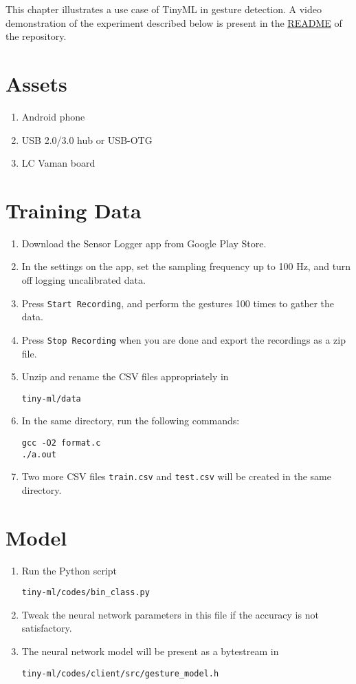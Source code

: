 This chapter illustrates a use case of TinyML in gesture detection. A video
demonstration of the experiment described below is present in the 
\href{https://github.com/gadepall/aiml#TinyML}{README} of the repository.

\section{Assets}
\begin{enumerate}
    \item Android phone
    \item USB 2.0/3.0 hub or USB-OTG
    \item LC Vaman board
\end{enumerate}

\section{Training Data}
\begin{enumerate}
    \item Download the Sensor Logger app from Google Play Store.
    \item In the settings on the app, set the sampling frequency up to 100 Hz, 
    and turn off logging uncalibrated data.
    \item Press \texttt{Start Recording}, and perform the gestures 100 times
    to gather the data.
    \item Press \texttt{Stop Recording} when you are done and export the 
    recordings as a zip file.
    \item Unzip and rename the CSV files appropriately in
    \begin{lstlisting}
tiny-ml/data
    \end{lstlisting}
    \item In the same directory, run the following commands:
    \begin{lstlisting}
gcc -O2 format.c
./a.out
    \end{lstlisting}
    \item Two more CSV files \texttt{train.csv} and \texttt{test.csv} will be 
    created in the same directory.
\end{enumerate}

\section{Model}
\begin{enumerate}
    \item Run the Python script
    \begin{lstlisting}
tiny-ml/codes/bin_class.py
    \end{lstlisting}
    \item Tweak the neural network parameters in this file if the accuracy is
    not satisfactory.
    \item The neural network model will be present as a bytestream in
    \begin{lstlisting}
tiny-ml/codes/client/src/gesture_model.h  
    \end{lstlisting}
\end{enumerate}

